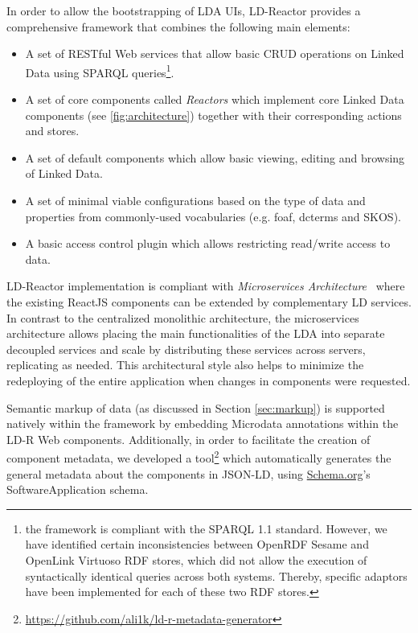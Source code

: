 \documentclass{llncs}
\begin{document}
In order to allow the bootstrapping of LDA UIs, LD-Reactor provides a comprehensive framework that combines the following main elements:
\begin{itemize}
\small
\item A set of RESTful Web services that allow basic CRUD operations on Linked Data using SPARQL queries\footnote{the framework is compliant with the SPARQL 1.1 standard. However, we have identified certain inconsistencies between OpenRDF Sesame and OpenLink Virtuoso RDF stores, which did not allow the execution of syntactically identical queries across both systems. Thereby, specific adaptors have been implemented for each of these two RDF stores.}.

\item A set of core components called \emph{Reactors} which implement core Linked Data components (see \autoref{fig:architecture}) together with their corresponding actions and stores.

\item A set of default components which allow basic viewing, editing and browsing of Linked Data.

\item A set of minimal viable configurations based on the type of data and properties from commonly-used vocabularies (e.g. foaf, dcterms and SKOS).

\item A basic access control plugin which allows restricting read/write access to data.

\end{itemize}


LD-Reactor implementation is compliant with \emph{Microservices Architecture}~\cite{microservices} where the existing ReactJS components can be extended by complementary LD services.
In contrast to the centralized monolithic architecture, the microservices architecture allows placing the main functionalities of the LDA into separate decoupled services and scale by distributing these services across servers, replicating as needed.
This architectural style also helps to minimize the redeploying of the entire application when changes in components were requested.

Semantic markup of data (as discussed in Section \ref{sec:markup}) is supported natively within the framework by embedding Microdata annotations within the LD-R Web components.
Additionally, in order to facilitate the creation of component metadata, we developed a tool\footnote{\url{https://github.com/ali1k/ld-r-metadata-generator}} which automatically generates the general metadata about the components in JSON-LD, using \url{Schema.org}'s SoftwareApplication schema.
\end{document}
